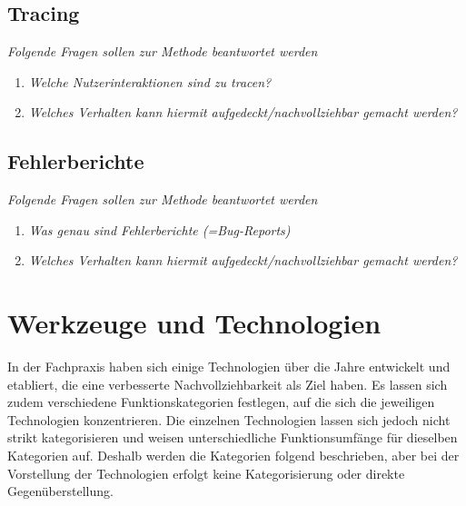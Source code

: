 \subsection{Tracing}

\textit{Folgende Fragen sollen zur Methode beantwortet werden}
\begin{enumerate}
	\item \textit{Welche Nutzerinteraktionen sind zu tracen?}
	\item \textit{Welches Verhalten kann hiermit aufgedeckt/nachvollziehbar gemacht werden?}
\end{enumerate}

\subsection{Fehlerberichte}

\textit{Folgende Fragen sollen zur Methode beantwortet werden}
\begin{enumerate}
	\item \textit{Was genau sind Fehlerberichte (=Bug-Reports) }
	\item \textit{Welches Verhalten kann hiermit aufgedeckt/nachvollziehbar gemacht werden?}
\end{enumerate}

\section{Werkzeuge und Technologien}

%
%

In der Fachpraxis haben sich einige Technologien über die Jahre entwickelt und etabliert, die eine verbesserte Nachvollziehbarkeit als Ziel haben. Es lassen sich zudem verschiedene Funktionskategorien festlegen, auf die sich die jeweiligen Technologien konzentrieren. Die einzelnen Technologien lassen sich jedoch nicht strikt kategorisieren und weisen unterschiedliche Funktionsumfänge für dieselben Kategorien auf. Deshalb werden die Kategorien folgend beschrieben, aber bei der Vorstellung der Technologien erfolgt keine Kategorisierung oder direkte Gegenüberstellung.

